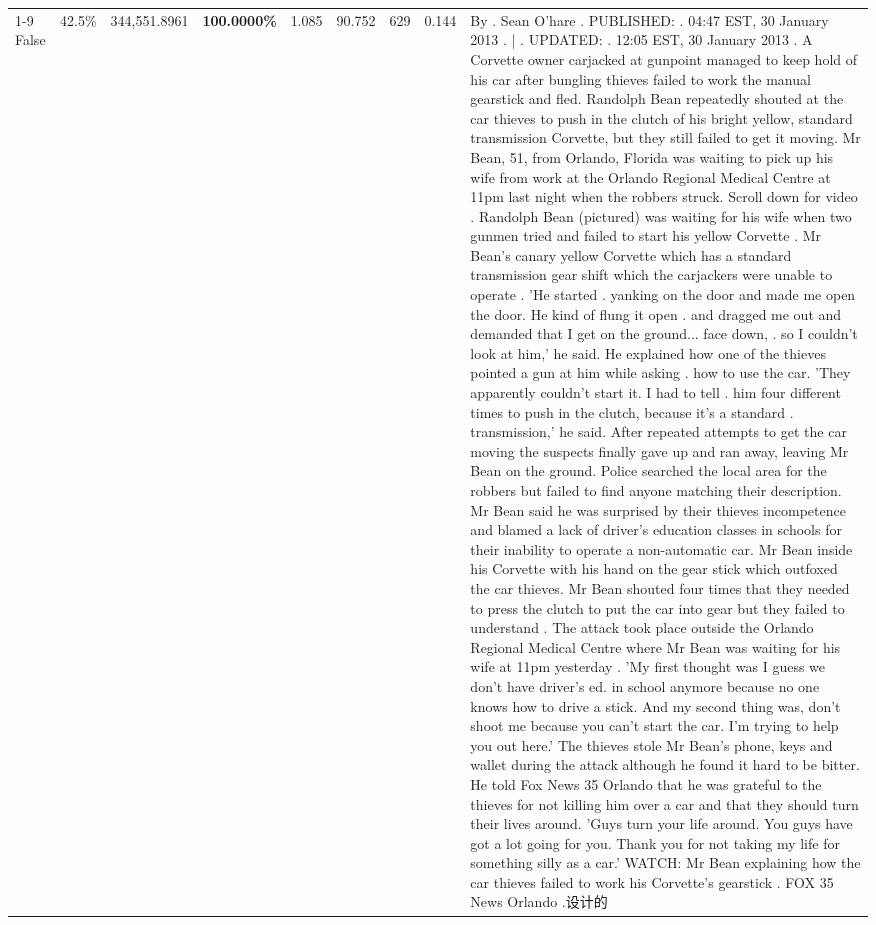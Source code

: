 \begin{table}[H]
\begin{tabular}{lllrlllll}
\cline{1-9} \cline{2-9}
False & 42.5\% & 344,551.8961 & \bfseries \color{red} 100.0000\% & 1.085 & 90.752 & 629 & 0.144 & By . Sean O'hare . PUBLISHED: . 04:47 EST, 30 January 2013 . | . UPDATED: . 12:05 EST, 30 January 2013 . A Corvette owner carjacked at gunpoint managed to keep hold of his car after bungling thieves failed to work the manual gearstick and fled. Randolph Bean repeatedly shouted at the car thieves to push in the clutch of his bright yellow, standard transmission Corvette, but they still failed to get it moving. Mr Bean, 51, from Orlando, Florida was waiting to pick up his wife from work at the Orlando Regional Medical Centre at 11pm last night when the robbers struck. Scroll down for video . Randolph Bean (pictured) was waiting for his wife when two gunmen tried and failed to start his yellow Corvette . Mr Bean's canary yellow Corvette which has a standard transmission gear shift which the carjackers were unable to operate . 'He started . yanking on the door and made me open the door. He kind of flung it open . and dragged me out and demanded that I get on the ground... face down, . so I couldn't look at him,' he said. He explained how one of the thieves pointed a gun at him while asking . how to use the car. 'They apparently couldn't start it. I had to tell . him four different times to push in the clutch, because it's a standard . transmission,' he said. After repeated attempts to get the car moving the suspects finally gave up and ran away, leaving Mr Bean on the ground. Police searched the local area for the robbers but failed to find anyone matching their description. Mr Bean said he was surprised by their thieves incompetence and blamed a lack of driver's education classes in schools for their inability to operate a non-automatic car. Mr Bean inside his Corvette with his hand on the gear stick which outfoxed the car thieves. Mr Bean shouted four times that they needed to press the clutch to put the car into gear but they failed to understand . The attack took place outside the Orlando Regional Medical Centre where Mr Bean was waiting for his wife at 11pm yesterday . 'My first thought was I guess we don't have driver's ed. in school anymore because no one knows how to drive a stick. And my second thing was, don't shoot me because you can't start the car. I'm trying to help you out here.' The thieves stole Mr Bean's phone, keys and wallet during the attack although he found it hard to be bitter. He told Fox News 35 Orlando that he was grateful to the thieves for not killing him over a car and that they should turn their lives around. 'Guys turn your life around. You guys have got a lot going for you. Thank you for not taking my life for something silly as a car.' WATCH: Mr Bean explaining how the car thieves failed to work his Corvette's gearstick . FOX 35 News Orlando .设计的 \\

\end{tabular}
\end{table}
